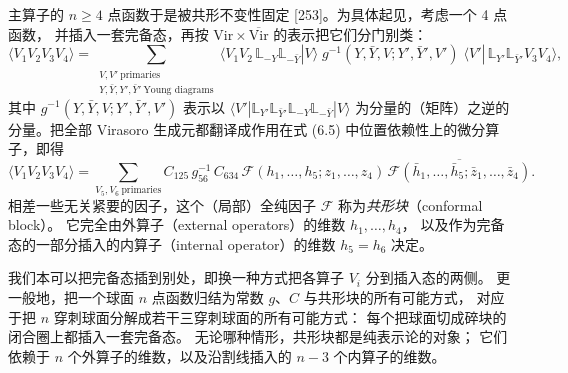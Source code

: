 
主算子的 $n\ge 4$ 点函数于是被共形不变性固定 [253]。为具体起见，考虑一个 4 点函数，
并插入一套完备态，再按 $\mathrm{Vir}\times\overline{\mathrm{Vir}}$ 的表示把它们分门别类：
\begin{equation}
\langle V_1V_2V_3V_4\rangle
=\sum_{\substack{V,V'\ \text{primaries}\\ Y,\bar Y,Y',\bar Y'\ \text{Young diagrams}}}
\langle V_1V_2\,\mathbb{L}_{-Y}\mathbb{L}_{-\bar Y}|V\rangle\;
g^{-1}(Y,\bar Y,V;Y',\bar Y',V')\;
\langle V'|\,\mathbb{L}_{Y'}\mathbb{L}_{\bar Y'}V_3V_4\rangle,
\tag{6.6}
\end{equation}
其中 $g^{-1}(Y,\bar Y,V;Y',\bar Y',V')$ 表示以
$\langle V'|\mathbb{L}_{Y'}\mathbb{L}_{\bar Y'}\mathbb{L}_{-Y}\mathbb{L}_{-\bar Y}|V\rangle$
为分量的（矩阵）之逆的分量。把全部 Virasoro 生成元都翻译成作用在式 (6.5) 中位置依赖性上的微分算子，即得
\begin{equation}
\langle V_1V_2V_3V_4\rangle
=\sum_{V_5,V_6\ \text{primaries}}
C_{125}\,g^{-1}_{56}\,C_{634}\,
\mathcal{F}(h_1,\dots,h_5;z_1,\dots,z_4)\,
\overline{\mathcal{F}(\bar h_1,\dots,\bar h_5;\bar z_1,\dots,\bar z_4)}.
\tag{6.7}
\end{equation}
相差一些无关紧要的因子，这个（局部）全纯因子 $\mathcal{F}$ 称为\emph{共形块}（conformal block）。
它完全由外算子（external operators）的维数 $h_1,\dots,h_4$，
以及作为完备态的一部分插入的内算子（internal operator）的维数 $h_5=h_6$ 决定。

我们本可以把完备态插到别处，即换一种方式把各算子 $V_i$ 分到插入态的两侧。
更一般地，把一个球面 $n$ 点函数归结为常数 $g$、$C$ 与共形块的所有可能方式，
对应于把 $n$ 穿刺球面分解成若干三穿刺球面的所有可能方式：
每个把球面切成碎块的闭合圈上都插入一套完备态。
无论哪种情形，共形块都是纯表示论的对象；
它们依赖于 $n$ 个外算子的维数，以及沿割线插入的 $n-3$ 个内算子的维数。


